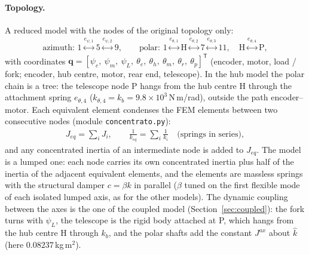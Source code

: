 \documentclass[10pt,a4paper]{article}
\numberwithin{equation}{section}
\begin{document}
\paragraph{Topology.} A reduced model with the nodes of the original topology only:
\begin{gather}
\text{azimuth: } 1 \overset{e_{\psi,1}}{\longleftrightarrow} 5 \overset{e_{\psi,2}}{\longleftrightarrow} 9, \qquad \text{polar: } 1 \overset{e_{\theta,1}}{\longleftrightarrow} \mathrm H \overset{e_{\theta,2}}{\longleftrightarrow} 7 \overset{e_{\theta,3}}{\longleftrightarrow} 11,\quad \mathrm H \overset{e_{\theta,4}}{\longleftrightarrow} \mathrm P,
\end{gather}
with coordinates $\mathbf q = [\psi_e,\ \psi_m,\ \psi_L,\ \theta_e,\ \theta_h,\ \theta_m,\ \theta_r,\ \theta_p]^{\mathsf T}$ (encoder, motor, load / fork; encoder, hub centre, motor, rear end, telescope). In the hub model the polar chain is a tree: the telescope node P hangs from the hub centre H through the attachment spring $e_{\theta,4}$ ($k_{\theta,4} = k_b = 9.8\times10^{3}$\,N\,m/rad), outside the path encoder--motor. Each equivalent element condenses the FEM elements between two consecutive nodes (module \texttt{concentrato.py}):
\begin{gather}
J_{eq} = \sum_i J_i, \qquad \frac{1}{k_{eq}} = \sum_i\frac{1}{k_i}\quad\text{(springs in series)},
\end{gather}
and any concentrated inertia of an intermediate node is added to $J_{eq}$. The model is a lumped one: each node carries its own concentrated inertia plus half of the inertia of the adjacent equivalent elements, and the elements are massless springs with the structural damper $c = \beta k$ in parallel ($\beta$ tuned on the first flexible mode of each isolated lumped axis, as for the other models). The dynamic coupling between the axes is the one of the coupled model (Section~\ref{sec:coupled}): the fork turns with $\psi_L$, the telescope is the rigid body attached at P, which hangs from the hub centre H through $k_b$, and the polar shafts add the constant $J^{ax}$ about $\hat k$ (here $0.08237$\,kg\,m$^2$).
\end{document}
